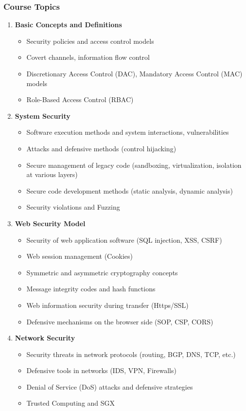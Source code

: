 \documentclass[12pt]{article}
\begin{document}
\subsubsection*{Course Topics}
\begin{enumerate}
    \item \textbf{Basic Concepts and Definitions}
    \begin{itemize}
        \item Security policies and access control models
        \item Covert channels, information flow control
        \item Discretionary Access Control (DAC), Mandatory Access Control (MAC) models
        \item Role-Based Access Control (RBAC)
    \end{itemize}
    
    \item \textbf{System Security}
    \begin{itemize}
        \item Software execution methods and system interactions, vulnerabilities
        \item Attacks and defensive methods (control hijacking)
        \item Secure management of legacy code (sandboxing, virtualization, isolation at various layers)
        \item Secure code development methods (static analysis, dynamic analysis)
        \item Security violations and Fuzzing
    \end{itemize}

    \item \textbf{Web Security Model}
    \begin{itemize}
        \item Security of web application software (SQL injection, XSS, CSRF)
        \item Web session management (Cookies)
        \item Symmetric and asymmetric cryptography concepts
        \item Message integrity codes and hash functions
        \item Web information security during transfer (Https/SSL)
        \item Defensive mechanisms on the browser side (SOP, CSP, CORS)
    \end{itemize}
    
    \item \textbf{Network Security}
    \begin{itemize}
        \item Security threats in network protocols (routing, BGP, DNS, TCP, etc.)
        \item Defensive tools in networks (IDS, VPN, Firewalls)
        \item Denial of Service (DoS) attacks and defensive strategies
        \item Trusted Computing and SGX
    \end{itemize}


\end{enumerate}
\end{document}
